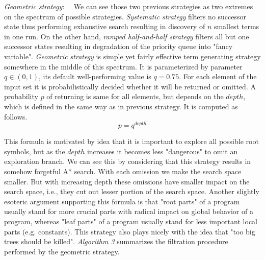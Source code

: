 \documentclass[conference]{IEEEtran}
\begin{document}
\textit{Geometric strategy}:~~
We can see those two previous strategies as two extremes on the spectrum of 
possible strategies. 
\textit{Systematic strategy} filters no successor state thus performing
exhaustive search resulting in discovery of $n$ smallest terms in one run.
On the other hand, \textit{ramped half-and-half strategy} filters 
all but one successor states resulting in degradation of 
the priority queue into "fancy variable".
\textit{Geometric strategy} is simple yet fairly effective term generating 
strategy somewhere in the middle of this spectrum.
It is parameterized by parameter $q \in (0,1)$, its default well-performing 
value is $q = 0.75$.
For each element of the input set 
it is probabilistically decided whether
it will be returned or omitted. A probability $p$ of returning is
same for all elements, but depends on the $depth$, 
which is defined in the same way as in previous strategy. 
It is computed as follows.
$$ p = q^{depth} $$

This formula is motivated by idea that it is important to
explore all possible root symbols, but as the $depth$ 
increases it becomes less "dangerous" to omit 
an exploration branch. 
We can see this by considering that this strategy results in
somehow forgetful A* search.
With each omission we make the search space smaller. But with
increasing depth these omissions have smaller impact on the search space,
i.e., they cut out lesser portion of the search space.
Another slightly esoteric argument supporting this formula is that "root 
parts" of a program usually stand for more crucial parts
with radical impact on global behavior of a program, 
whereas "leaf parts" of a program usually
stand for less important local parts (e.g. constants).  
This strategy also plays nicely with the idea that 
"too big trees should be killed". 
\textit{Algorithm 3} summarizes the filtration procedure performed by the geometric strategy. 
\end{document}
